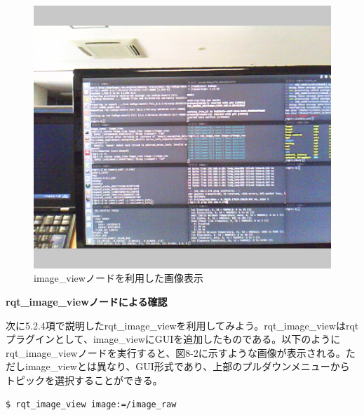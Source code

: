 \begin{figure}[ht]
  \centering
  \includegraphics[width=\columnwidth]{pictures/chapter8/pic_08_01.png}
  \caption{image\_viewノードを利用した画像表示}
\end{figure}


\textbf{rqt\_image\_viewノードによる確認}

次に5.2.4項で説明したrqt\_image\_viewを利用してみよう。rqt\_image\_viewはrqtプラグインとして、image\_viewにGUIを追加したものである。以下のようにrqt\_image\_viewノードを実行すると、図8-2に示すような画像が表示される。ただしimage\_viewとは異なり、GUI形式であり、上部のプルダウンメニューからトピックを選択することができる。

\begin{lstlisting}[language=ROS]
$ rqt_image_view image:=/image_raw
\end{lstlisting}

